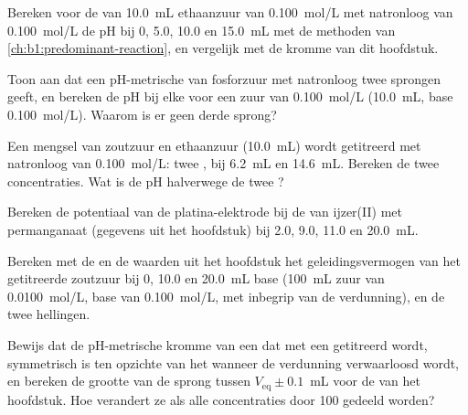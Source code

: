 \begin{exercise}[$\star\star$]\label{exo:b1:titration-methods:5}
Bereken voor de  van \qty{10.0}{mL} ethaanzuur van
\qty{0.100}{mol/L} met natronloog van \qty{0.100}{mol/L} de pH bij 0,
5.0, 10.0 en \qty{15.0}{mL} met de methoden van
\cref{ch:b1:predominant-reaction}, en vergelijk met de kromme van dit
hoofdstuk.
\end{exercise}

\begin{exercise}[$\star\star$]\label{exo:b1:titration-methods:6}
Toon aan dat een pH-metrische  van fosforzuur met natronloog
twee sprongen geeft, en bereken de pH bij elke  voor een zuur
van \qty{0.100}{mol/L} (\qty{10.0}{mL}, base \qty{0.100}{mol/L}). Waarom
is er geen derde sprong?
\end{exercise}

\begin{exercise}[$\star\star$]\label{exo:b1:titration-methods:7}
Een mengsel van zoutzuur en ethaanzuur (\qty{10.0}{mL}) wordt getitreerd
met natronloog van \qty{0.100}{mol/L}: twee , bij
\qty{6.2}{mL} en \qty{14.6}{mL}. Bereken de twee concentraties. Wat is de
pH halverwege de twee ?
\end{exercise}

\begin{exercise}[$\star\star$]\label{exo:b1:titration-methods:8}
Bereken de potentiaal van de platina-elektrode bij de  van
ijzer(II) met permanganaat (gegevens uit het hoofdstuk) bij 2.0, 9.0,
11.0 en \qty{20.0}{mL}.
\end{exercise}

\begin{exercise}[$\star\star$]\label{exo:b1:titration-methods:9}
Bereken met de  en de waarden uit het hoofdstuk het
geleidingsvermogen van het getitreerde zoutzuur bij 0, 10.0 en
\qty{20.0}{mL} base (\qty{100}{mL} zuur van \qty{0.0100}{mol/L}, base
van \qty{0.100}{mol/L}, met inbegrip van de verdunning), en de twee
hellingen.
\end{exercise}

\begin{exercise}[$\star\star\star$]\label{exo:b1:titration-methods:10}
Bewijs dat de pH-metrische kromme van een  dat met een  getitreerd wordt, symmetrisch is ten opzichte van het
 wanneer de verdunning verwaarloosd wordt, en bereken de
grootte van de sprong tussen $V_{\mathrm{eq}} \pm 0.1$~mL voor de
 van het hoofdstuk. Hoe verandert ze als alle concentraties door
100 gedeeld worden?
\end{exercise}

